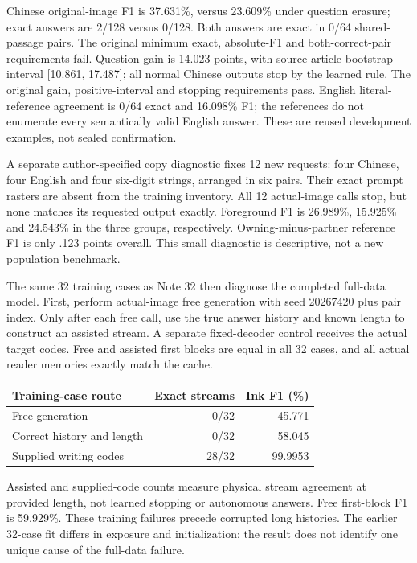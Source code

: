 \documentclass[10pt,a4paper]{article}
\begin{document}
Chinese original-image F1 is 37.631\%, versus 23.609\% under question erasure;
exact answers are 2/128 versus 0/128. Both answers are exact in 0/64 shared-
passage pairs. The original minimum exact, absolute-F1 and both-correct-pair
requirements fail. Question gain is 14.023 points, with source-article
bootstrap interval [10.861, 17.487]; all normal Chinese outputs stop by the
learned rule. The original gain, positive-interval and stopping requirements
pass. English literal-reference agreement is 0/64 exact and 16.098\% F1;
the references do not enumerate every semantically valid English answer.
These are reused development examples, not sealed confirmation.

A separate author-specified copy diagnostic fixes 12 new requests: four
Chinese, four English and four six-digit strings, arranged in six pairs.
Their exact prompt rasters are absent from the training inventory. All
12 actual-image calls stop, but none matches its requested output exactly.
Foreground F1 is 26.989\%, 15.925\% and 24.543\% in the three groups,
respectively. Owning-minus-partner reference F1 is only .123 points overall.
This small diagnostic is descriptive, not a new population benchmark.

The same 32 training cases as Note 32 then diagnose the completed full-data
model. First, perform actual-image free generation with seed 20267420 plus
pair index. Only after each free call, use the true answer history and known
length to construct an assisted stream. A separate fixed-decoder control
receives the actual target codes. Free and assisted first blocks are equal
in all 32 cases, and all actual reader memories exactly match the cache.
\begin{center}\small
\begin{tabular}{lrr}
\toprule
Training-case route & Exact streams & Ink F1 (\%)\\
\midrule
Free generation & 0/32 & 45.771\\
Correct history and length & 0/32 & 58.045\\
Supplied writing codes & 28/32 & 99.9953\\
\bottomrule
\end{tabular}
\end{center}
Assisted and supplied-code counts measure physical stream agreement at
provided length, not learned stopping or autonomous answers. Free first-block
F1 is 59.929\%. These training failures precede corrupted long histories.
The earlier 32-case fit differs in exposure and initialization; the result
does not identify one unique cause of the full-data failure.
\end{document}
